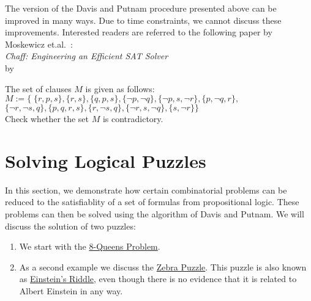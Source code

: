 The version of the Davis and Putnam procedure presented above can be improved in many ways.
Due to time constraints, we cannot discuss these improvements. Interested readers are
referred to the following paper by Moskewicz et.al.~\cite{moskewicz:2001}: 
\\[0.2cm]
\hspace*{1.3cm} \textsl{Chaff: Engineering an Efficient SAT Solver} \\
\hspace*{1.3cm} by  

\exerciseEng
The set of clauses $M$ is given as follows: \\[0.2cm]
\hspace*{1.3cm} $M := \bigl\{ \; \{ r, p, s \},
                         \{r, s \}, \{ q, p, s \},
                         \{ \neg p,  \neg q\},
                         \{ \neg p, s,  \neg r\},
                         \{p,  \neg q, r \},$ \\[0.2cm]
\hspace*{2.6cm} $\{ \neg r,  \neg s, q\},
                         \{p, q, r, s \},
                         \{r,  \neg s, q\},
                         \{ \neg r,  s, \neg q\},
                         \{s, \neg r\} \bigr\}$ \\[0.2cm]
Check whether the set $M$ is contradictory.  \eox

\section{Solving Logical Puzzles}
In this section, we demonstrate how certain combinatorial problems can be reduced to the satisfiablity of a
set of formulas from propositional logic.  These problems can then be solved using the algorithm of
Davis and Putnam.  We will discuss the solution of two puzzles:
\begin{enumerate}
\item We start with the
      \href{https://en.wikipedia.org/wiki/Eight_queens_puzzle}{8-Queens Problem}. 
\item As a second example we discuss the
      \href{https://en.wikipedia.org/wiki/Zebra_puzzle}{Zebra Puzzle}.  This puzzle is also known as
      \href{https://www.brainzilla.com/logic/zebra/einsteins-riddle/}{Einstein's Riddle},
      even though there is no evidence that it is related to Albert Einstein in any way.
\end{enumerate}

